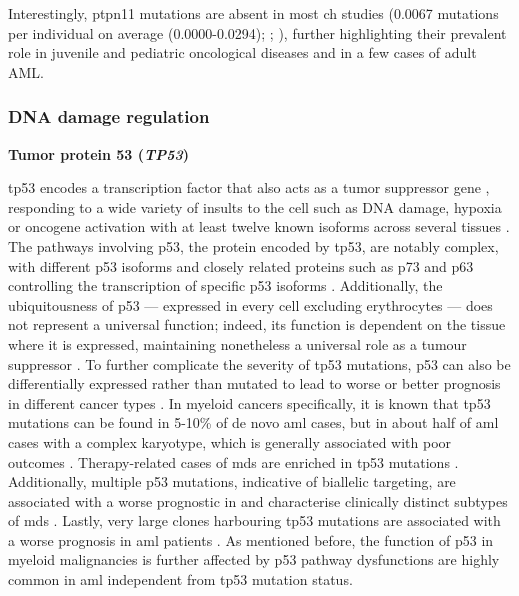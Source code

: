 Interestingly, \ac{ptpn11} mutations are absent in most \ac{ch} studies \cite{Jaiswal2014-rl,Genovese2014-eu,Zink2017-zi,Bolton2020-ct,Coombs2017-ph,Acuna-Hidalgo2017-ng,Young2016-du,Young2019-rz} (0.0067 mutations per individual on average (0.0000-0.0294); ; ), further highlighting their prevalent role in juvenile and pediatric oncological diseases and in a few cases of adult AML.

\subsubsection{DNA damage regulation}

\noindent \textbf{Tumor protein 53 (\textit{TP53})}

\Ac{tp53} encodes a transcription factor that also acts as a tumor suppressor gene \cite{Surget2013-xh}, responding to a wide variety of insults to the cell such as DNA damage, hypoxia or oncogene activation \cite{Oren2003-gg} with at least twelve known isoforms across several tissues \cite{Khoury2011-yk,Bourdon2005-ne}. The pathways involving p53, the protein encoded by \ac{tp53}, are notably complex, with different p53 isoforms and closely related proteins such as p73 and p63 controlling the transcription of specific p53 isoforms \cite{Bourdon2005-ne}. Additionally, the ubiquitousness of p53 --- expressed in every cell excluding erythrocytes --- does not represent a universal function; indeed, its function is dependent on the tissue where it is expressed, maintaining nonetheless a universal role as a tumour suppressor \cite{Surget2013-xh}. To further complicate the severity of \ac{tp53} mutations, p53 can also be differentially expressed rather than mutated to lead to worse or better prognosis in different cancer types \cite{Bourdon2011-hc,Song2009-oq,Surget2013-xh}. In myeloid cancers specifically, it is known that \ac{tp53} mutations can be found in 5-10\% of de novo \ac{aml} cases, but in about half of \ac{aml} cases with a complex karyotype, which is generally associated with poor outcomes \cite{Hou2015-jz,Rucker2012-oj,Bowen2009-ep}. Therapy-related cases of \ac{mds} are enriched in \ac{tp53} mutations \cite{Wong2015-ki}. Additionally, multiple p53 mutations, indicative of biallelic targeting, are associated with a worse prognostic in and characterise clinically distinct subtypes of \ac{mds} \cite{Bernard2020-fj}. Lastly, very large clones harbouring \ac{tp53} mutations are associated with a worse prognosis in \ac{aml} patients \cite{Short2020-qu}. As mentioned before, the function of p53 in myeloid malignancies is further affected by p53 pathway dysfunctions are highly common in \ac{aml} \cite{Quintas-Cardama2017-tj,Abramowitz2017-lg} independent from \ac{tp53} mutation status.

